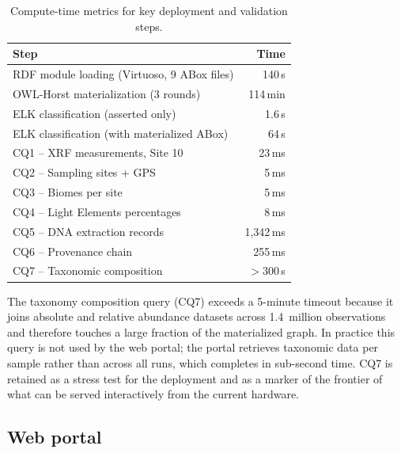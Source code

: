 \documentclass[11pt,a4paper]{article}
\begin{document}
\begin{table}[h]
\centering
\caption{Compute-time metrics for key deployment and validation
  steps.}
\label{tab:compute}
\small
\begin{tabular}{lr}
\toprule
\textbf{Step} & \textbf{Time} \\
\midrule
RDF module loading (Virtuoso, 9 ABox files)  & 140\,s \\
OWL-Horst materialization (3 rounds)         & 114\,min \\
ELK classification (asserted only)           & 1.6\,s \\
ELK classification (with materialized ABox)  & 64\,s \\
CQ1 -- XRF measurements, Site 10             & 23\,ms \\
CQ2 -- Sampling sites + GPS                  & 5\,ms \\
CQ3 -- Biomes per site                       & 5\,ms \\
CQ4 -- Light Elements percentages            & 8\,ms \\
CQ5 -- DNA extraction records                & 1{,}342\,ms \\
CQ6 -- Provenance chain                      & 255\,ms \\
CQ7 -- Taxonomic composition                 & $>$300\,s \\
\bottomrule
\end{tabular}
\end{table}

The taxonomy composition query (CQ7) exceeds a 5-minute timeout
because it joins absolute and relative abundance datasets across
1.4~million observations and therefore touches a large fraction of
the materialized graph. In practice this query is not used by the
web portal; the portal retrieves taxonomic data per sample rather
than across all runs, which completes in sub-second time. CQ7 is
retained as a stress test for the deployment and as a marker of the
frontier of what can be served interactively from the current
hardware.

\subsection{Web portal}
\end{document}
